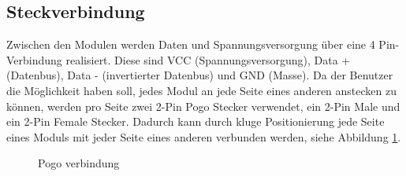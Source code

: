 \subsection{Steckverbindung}
Zwischen den Modulen werden Daten und Spannungsversorgung über eine 4 Pin-Verbindung realisiert. Diese sind VCC (Spannungsversorgung), Data + (Datenbus), Data - (invertierter Datenbus) und GND (Masse). Da der Benutzer die Möglichkeit haben soll, jedes Modul an jede Seite eines anderen anstecken zu können, werden pro Seite zwei 2-Pin Pogo Stecker verwendet, ein 2-Pin Male und ein 2-Pin Female Stecker. Dadurch kann durch kluge Positionierung jede Seite eines Moduls mit jeder Seite eines anderen verbunden werden, siehe Abbildung \ref{pogo_verbindung}.
\begin{figure}[H]
    \centering    
    \caption{Pogo verbindung}
    \label{pogo_verbindung}
\end{figure}